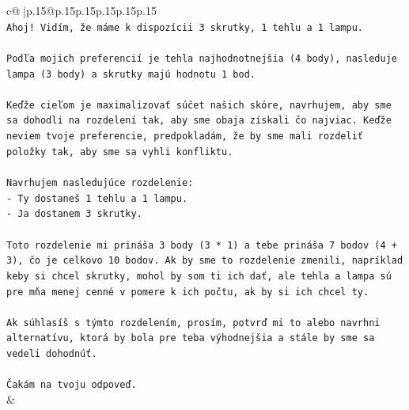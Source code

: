 \documentclass{article}
\begin{document}
{\begin{supertabular}{c@{$\;$}|p{.15\linewidth}@{}p{.15\linewidth}p{.15\linewidth}p{.15\linewidth}p{.15\linewidth}p{.15\linewidth}}
{{{\\ 
\texttt{Ahoj! Vidím, že máme k dispozícii 3 skrutky, 1 tehlu a 1 lampu.} \\
\\ 
\texttt{Podľa mojich preferencií je tehla najhodnotnejšia (4 body), nasleduje lampa (3 body) a skrutky majú hodnotu 1 bod.} \\
\\ 
\texttt{Keďže cieľom je maximalizovať súčet našich skóre, navrhujem, aby sme sa dohodli na rozdelení tak, aby sme obaja získali čo najviac. Keďže neviem tvoje preferencie, predpokladám, že by sme mali rozdeliť položky tak, aby sme sa vyhli konfliktu.} \\
\\ 
\texttt{Navrhujem nasledujúce rozdelenie:} \\
\texttt{{-} Ty dostaneš 1 tehlu a 1 lampu.} \\
\texttt{{-} Ja dostanem 3 skrutky.} \\
\\ 
\texttt{Toto rozdelenie mi prináša 3 body (3 * 1) a tebe prináša 7 bodov (4 + 3), čo je celkovo 10 bodov. Ak by sme to rozdelenie zmenili, napríklad keby si chcel skrutky, mohol by som ti ich dať, ale tehla a lampa sú pre mňa menej cenné v pomere k ich počtu, ak by si ich chcel ty.} \\
\\ 
\texttt{Ak súhlasíš s týmto rozdelením, prosím, potvrď mi to alebo navrhni alternatívu, ktorá by bola pre teba výhodnejšia a stále by sme sa vedeli dohodnúť.} \\
\\ 
\texttt{Čakám na tvoju odpoveď.} \\
            }
        }
    }
    & \\ \\


\end{supertabular}}
\end{document}
